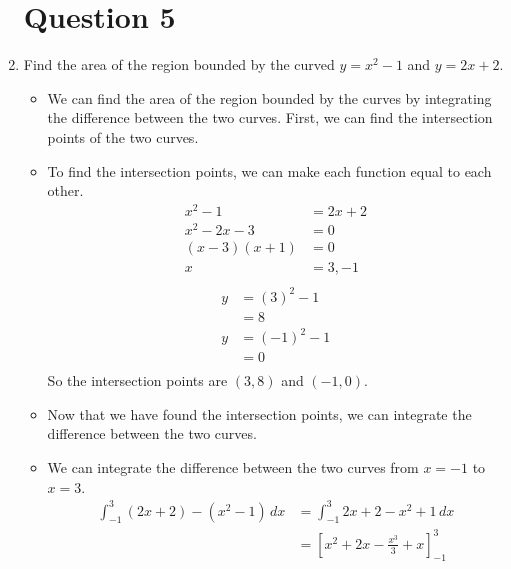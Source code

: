\documentclass[12pt]{article}
\begin{document}
\begin{enumerate}[leftmargin=\labelsep]
    \newpage

    \section*{Question 5}

    \item Find the area of the region bounded by the curved $y=x^2-1$ and $y=2x+2$.
    \begin{itemize}[label={}]
        \item We can find the area of the region bounded by the curves by integrating the difference between the two curves. First, we can find the intersection points of the two curves.
        \item To find the intersection points, we can make each function equal to each other.
        \begin{equation*}
            \begin{split}
                x^2-1 &= 2x+2 \\
                x^2-2x-3 &= 0 \\
                (x-3)(x+1) &= 0 \\
                x &= 3, -1 \\
            \end{split}
        \end{equation*}
        \begin{equation*}
            \begin{split}
                y &= (3)^2-1 \\
                &= 8 \\
                y &= (-1)^2-1 \\
                &= 0 \\
            \end{split}
        \end{equation*}
        So the intersection points are $(3,8)$ and $(-1,0)$.
        \item Now that we have found the intersection points, we can integrate the difference between the two curves.
        \item We can integrate the difference between the two curves from $x=-1$ to $x=3$.
        \begin{equation*}
            \begin{split}
                \int_{-1}^{3} (2x+2)-(x^2-1) \, dx &= \int_{-1}^{3} 2x+2-x^2+1 \, dx \\
                &= \left[ x^2 + 2x - \frac{x^3}{3} + x \right]_{-1}^{3} \\

\end{split}
\end{equation*}
\end{itemize}
\end{enumerate}
\end{document}
